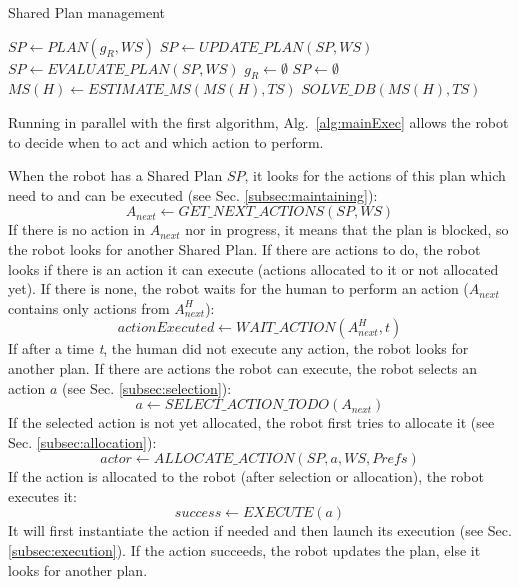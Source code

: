 \documentclass[english,a4paper,11pt,twoside]{StyleThese}
\begin{document}
\newpage
\begin{algorithm}
\caption{Shared Plan management}
\label{alg:mainPlan}
\begin{algorithmic}
\STATE $SP \leftarrow PLAN(g_R, WS)$
\ENDIF
{}
\STATE $SP \leftarrow UPDATE\_PLAN(SP, WS)$
\ENDIF
{}
\STATE $SP \leftarrow EVALUATE\_ PLAN(SP, WS)$
\ENDIF
{}
\STATE $g_R \leftarrow \emptyset$ 
\STATE $SP \leftarrow \emptyset$
\ENDIF
{}
\STATE $MS(H) \leftarrow ESTIMATE\_MS(MS(H), TS)$
\STATE $SOLVE\_DB(MS(H), TS)$
\ENDIF
\ENDIF
\ENDWHILE
\end{algorithmic}
\end{algorithm} 

Running in parallel with the first algorithm, Alg.~\ref{alg:mainExec} allows the robot to decide when to act and which action to perform. 


When the robot has a Shared Plan $SP$, it looks for the actions of this plan which need to and can be executed (see Sec. \ref{subsec:maintaining}):
$$A_{next} \leftarrow GET\_NEXT\_ACTIONS(SP, WS)$$
If there is no action in $A_{next}$ nor in progress, it means that the plan is blocked, so the robot looks for another Shared Plan. If there are actions to do, the robot looks if there is an action it can execute (actions allocated to it or not allocated yet). If there is none, the robot waits for the human to perform an action ($A_{next}$ contains only actions from $A^H_{next}$):
$$actionExecuted \leftarrow WAIT\_ACTION(A^H_{next}, t)$$
If after a time \textit{t}, the human did not execute any action, the robot looks for another plan.
If there are actions the robot can execute, the robot selects an action $a$ (see Sec. \ref{subsec:selection}):
$$a \leftarrow SELECT\_ACTION\_TODO(A_{next})$$
If the selected action is not yet allocated, the robot first tries to allocate it (see Sec. \ref{subsec:allocation}):
$$actor \leftarrow ALLOCATE\_ACTION(SP, a, WS, Prefs)$$
If the action is allocated to the robot (after selection or allocation), the robot executes it:
$$success \leftarrow EXECUTE(a)$$
It will first instantiate the action if needed and then launch its execution (see Sec. \ref{subsec:execution}). If the action succeeds, the robot updates the plan, else it looks for another plan.
\end{document}
